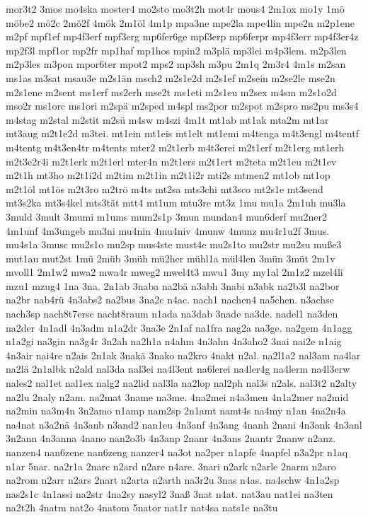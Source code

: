 {mor3t2
3mos
mo4ska
moster4
mo2sto
mo3t2h
mot4r
mous4
2m1ox
mo1y
1mö
möbe2
mö2c
2mö2f
4mök
2m1öl
4m1p
mpa3ne
mpe2la
mpe4lin
mpe2n
m2p1ene
m2pf
mpf1ef
mp4f3erf
mpf3erg
mp6fer6ge
mpf3erp
mp6ferpr
mp4f3err
mp4f3er4z
mp2f3l
mpf1or
mp2fr
mp1haf
mp1hos
mpin2
m3plä
mp3lei
m4p3lem.
m2p3len
m2p3les
m3pon
mpor6ter
mpot2
mps2
mp3sh
m3pu
2m1q
2m3r4
4m1s
m2san
ms1as
m3sat
msau3e
m2s1än
msch2
m2s1e2d
m2s1ef
m2sein
m2se2le
mse2n
m2s1ene
m2sent
ms1erf
ms2erh
mse2t
ms1eti
m2s1eu
m2sex
m4sm
m2s1o2d
mso2r
ms1orc
ms1ori
m2spä
m2sped
m4spl
ms2por
m2spot
m2spro
ms2pu
ms3s4
m4stag
m2stal
m2stit
m2sü
m4sw
m4szi
4m1t
mt1ab
mt1ak
mta2m
mt1ar
mt3aug
m2t1e2d
m3tei.
mt1ein
mt1eis
mt1elt
mt1emi
m4tenga
m4t3engl
m4tentf
m4tentg
m4t3en4tr
m4tents
mter2
m2t1erb
m4t3erei
m2t1erf
m2t1erg
mt1erh
m2t3e2r4i
m2t1erk
m2t1erl
mter4n
m2t1ers
m2t1ert
m2teta
m2t1eu
m2t1ev
m2t1h
mt3ho
m2t1i2d
m2tim
m2t1in
m2t1i2r
mti2s
mtmen2
mt1ob
mt1op
m2t1öl
mt1ös
m2t3ro
m2trö
m4ts
mt2sa
mts3chi
mt3sco
mt2s1e
mt3send
mt3s2ka
mt3s4kel
mts3tät
mtt4
mt1um
mtu3re
mt3z
1mu
mu1a
2m1uh
mu3la
3muld
3mult
3mumi
m1ums
mum2s1p
3mun
mundan4
mun6derf
mu2ner2
4m1unf
4m3ungeb
mu3ni
mu4nin
4mu4niv
4munw
4munz
mu4r1u2f
3mus.
mu4s1a
3musc
mu2s1o
mu2sp
mus4ste
must4e
mu2s1to
mu2str
mu2su
muße3
mut1au
mut2st
1mü
2müb
3müh
mü2her
mühl1a
mül4len
3mün
3müt
2m1v
mvoll1
2m1w2
mwa2
mwa4r
mweg2
mwel4t3
mwu1
3my
my1al
2m1z2
mzel4li
mzu1
mzug4
1na
3na.
2n1ab
3naba
na2bä
n3abh
3nabi
n3abk
na2b3l
na2bor
na2br
nab4rü
4n3abs2
na2bus
3na2c
n4ac.
nach1
nachen4
na5chen.
n3achse
nach3sp
nach8t7ersc
nacht8raum
n1ada
na3dab
3nade
na3de.
nadel1
na3den
na2der
4n1adl
4n3adm
n1a2dr
3na3e
2n1af
na1fra
nag2a
na3ge.
na2gem
4n1agg
n1a2gi
na3gin
na3g4r
3n2ah
na2h1a
n4ahm
4n3ahn
4n3aho2
3nai
nai2e
n1aig
4n3air
nai4re
n2ais
2n1ak
3nakä
3nako
na2kro
4nakt
n2al.
na2l1a2
nal3am
na4lar
na2lä
2n1albk
n2ald
nal3da
nal3ei
na4l3ent
na6lerei
na4ler4g
na4lerm
na4l3erw
nales2
nal1et
nal1ex
nalg2
na2lid
nal3la
na2lop
nal2ph
nal3s
n2als.
nal3t2
n2alty
na2lu
2naly
n2am.
na2mat
3name
na3me.
4na2mei
n4a3men
4n1a2mer
na2mid
na2min
na3m4n
3n2amo
n1amp
nam2sp
2n1amt
namt4s
na4my
n1an
4na2n4a
na4nat
n3a2nä
4n3anb
n3and2
nan1eu
4n3anf
4n3ang
4nanh
2nani
4n3ank
4n3anl
3n2ann
4n3anna
4nano
nan2o3b
4n3anp
2nanr
4n3ans
2nantr
2nanw
n2anz.
nanzen4
nan6zene
nan6zeng
nanzer4
na3ot
na2per
n1apfe
4napfel
n3a2pr
n1aq
n1ar
5nar.
na2r1a
2narc
n2ard
n2are
n4are.
3nari
n2ark
n2arle
2narm
n2aro
na2rom
n2arr
n2ars
2nart
n2arta
n2arth
na3r2u
3nas
n4as.
na4schw
4n1a2sp
nas2s1c
4n1assi
na2str
4na2sy
nasyl2
3naß
3nat
n4at.
nat3au
nat1ei
na3ten
na2t2h
4natm
nat2o
4natom
5nator
nat1r
nat4sa
nats1e
na3tu
}
